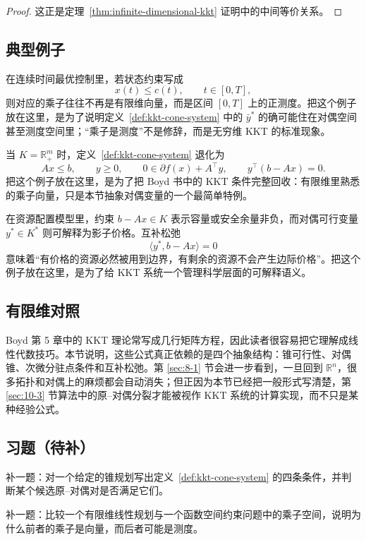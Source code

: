 \begin{proof}
这正是定理~\ref{thm:infinite-dimensional-kkt} 证明中的中间等价关系。
\end{proof}

\subsection{典型例子}

\begin{example}[状态约束最优控制中的测度乘子]\label{ex:measure-valued-multiplier}
在连续时间最优控制里，若状态约束写成
\[
x(t)\le c(t),\qquad t\in[0,T],
\]
则对应的乘子往往不再是有限维向量，而是区间 $[0,T]$ 上的正测度。把这个例子放在这里，是为了说明定义~\ref{def:kkt-cone-system} 中的 $\bar y^\ast$ 的确可能住在对偶空间甚至测度空间里；“乘子是测度”不是修辞，而是无穷维 KKT 的标准现象。
\end{example}

\begin{example}[线性规划的向量乘子]
当 $K=\mathbb R_+^m$ 时，定义~\ref{def:kkt-cone-system} 退化为
\[
Ax\le b,\qquad y\ge 0,\qquad 0\in \partial f(x)+A^\top y,\qquad y^\top(b-Ax)=0.
\]
把这个例子放在这里，是为了把 Boyd 书中的 KKT 条件完整回收：有限维里熟悉的乘子向量，只是本节抽象对偶变量的一个最简单特例。
\end{example}

\begin{example}[影子价格解释]
在资源配置模型里，约束 $b-Ax\in K$ 表示容量或安全余量非负，而对偶可行变量 $y^\ast\in K^\ast$ 则可解释为影子价格。互补松弛
\[
\langle y^\ast,b-Ax\rangle=0
\]
意味着“有价格的资源必然被用到边界，有剩余的资源不会产生边际价格”。把这个例子放在这里，是为了给 KKT 系统一个管理科学层面的可解释语义。
\end{example}

\subsection*{有限维对照}

Boyd 第 5 章中的 KKT 理论常写成几行矩阵方程，因此读者很容易把它理解成线性代数技巧。本节说明，这些公式真正依赖的是四个抽象结构：锥可行性、对偶锥、次微分驻点条件和互补松弛。第 \ref{sec:8-1} 节会进一步看到，一旦回到 $\mathbb R^n$，很多拓扑和对偶上的麻烦都会自动消失；但正因为本节已经把一般形式写清楚，第 \ref{sec:10-3} 节算法中的原--对偶分裂才能被视作 KKT 系统的计算实现，而不只是某种经验公式。

\subsection*{习题（待补）}

\begin{exercise}
补一题：对一个给定的锥规划写出定义~\ref{def:kkt-cone-system} 的四条条件，并判断某个候选原--对偶对是否满足它们。
\end{exercise}

\begin{exercise}[乘子空间桥接题占位]
补一题：比较一个有限维线性规划与一个函数空间约束问题中的乘子空间，说明为什么前者的乘子是向量，而后者可能是测度。
\end{exercise}
